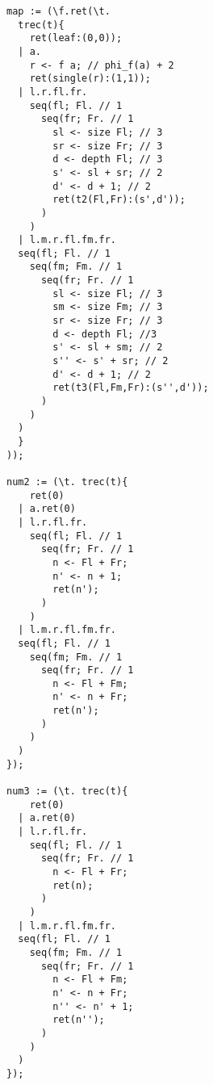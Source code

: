 \begin{verbatim}
map := (\f.ret(\t.
  trec(t){
    ret(leaf:(0,0));
  | a.
    r <- f a; // phi_f(a) + 2
    ret(single(r):(1,1));
  | l.r.fl.fr.
    seq(fl; Fl. // 1
      seq(fr; Fr. // 1
        sl <- size Fl; // 3
        sr <- size Fr; // 3
        d <- depth Fl; // 3
        s' <- sl + sr; // 2
        d' <- d + 1; // 2
        ret(t2(Fl,Fr):(s',d'));
      )
    )
  | l.m.r.fl.fm.fr.
  seq(fl; Fl. // 1
    seq(fm; Fm. // 1
      seq(fr; Fr. // 1
        sl <- size Fl; // 3
        sm <- size Fm; // 3
        sr <- size Fr; // 3
        d <- depth Fl; //3 
        s' <- sl + sm; // 2
        s'' <- s' + sr; // 2
        d' <- d + 1; // 2
        ret(t3(Fl,Fm,Fr):(s'',d'));
      )
    )
  )
  }
));

num2 := (\t. trec(t){
    ret(0)
  | a.ret(0)
  | l.r.fl.fr.
    seq(fl; Fl. // 1
      seq(fr; Fr. // 1
        n <- Fl + Fr;
        n' <- n + 1;
        ret(n');
      )
    )
  | l.m.r.fl.fm.fr.
  seq(fl; Fl. // 1
    seq(fm; Fm. // 1
      seq(fr; Fr. // 1
        n <- Fl + Fm;
        n' <- n + Fr;
        ret(n');
      )
    )
  )
});

num3 := (\t. trec(t){
    ret(0)
  | a.ret(0)
  | l.r.fl.fr.
    seq(fl; Fl. // 1
      seq(fr; Fr. // 1
        n <- Fl + Fr;
        ret(n);
      )
    )
  | l.m.r.fl.fm.fr.
  seq(fl; Fl. // 1
    seq(fm; Fm. // 1
      seq(fr; Fr. // 1
        n <- Fl + Fm;
        n' <- n + Fr;
        n'' <- n' + 1;
        ret(n'');
      )
    )
  )
});
\end{verbatim}

